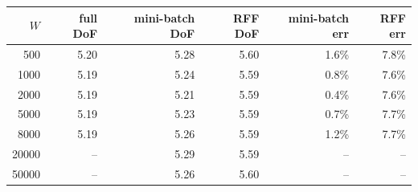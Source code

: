 \begin{tabular}{rrrrrr}
\toprule
$W$ & full DoF & mini-batch DoF & RFF DoF & mini-batch err & RFF err \\
\midrule
500 & 5.20 & 5.28 & 5.60 & 1.6\% & 7.8\% \\
1000 & 5.19 & 5.24 & 5.59 & 0.8\% & 7.6\% \\
2000 & 5.19 & 5.21 & 5.59 & 0.4\% & 7.6\% \\
5000 & 5.19 & 5.23 & 5.59 & 0.7\% & 7.7\% \\
8000 & 5.19 & 5.26 & 5.59 & 1.2\% & 7.7\% \\
20000 & -- & 5.29 & 5.59 & -- & -- \\
50000 & -- & 5.26 & 5.60 & -- & -- \\
\bottomrule
\end{tabular}
